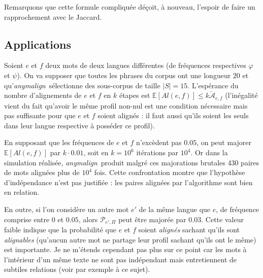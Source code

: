 \documentclass[a4paper,10pt]{article}
\newcommand{\anym}{\emph{anymalign}}
\begin{document}
Remarquons que cette formule compliquée déçoit, à nouveau, l'espoir de faire un rapprochement avec le Jaccard.



\subsection{Applications}

Soient $e$ et $f$ deux mots de deux langues différentes (de fréquences respectives $\varphi$ et $\psi$). On va supposer que toutes les phrases du corpus ont une longueur $20$ et qu'\anym~sélectionne des sous-corpus de taille $|S|=15$. L'espérance du nombre d'alignements de $e$ et $f$ en $k$ étapes est $\mathbb{E}[Al(e,f)] \leq k\check{\mathcal{A}}_{e,f}$ (l'inégalité vient du fait qu'avoir le même profil non-nul est une condition nécessaire mais pas suffisante pour que $e$ et $f$ soient alignés : il faut aussi qu'ils soient les seuls dans leur langue respective à posséder ce profil).

En supposant que les fréquences de $e$ et $f$ n'excèdent pas $0.05$, on peut majorer $\mathbb{E}[Al(e,f)]$ par $k\cdot0.01$, soit en $k=10^6$ itérations par $10^4$. Or dans la simulation réalisée, \anym~produit malgré ces majorations brutales 430 paires de mots alignées plus de $10^4$ fois. Cette confrontation montre que l'hypothèse d'indépendance n'est pas justifiée : les paires alignées par l'algorithme sont bien en relation.

En outre, si l'on considère un autre mot $e'$ de la même langue que $e$, de fréquence comprise entre $0$ et $0.05$, alors $\mathcal{P}_{e',\Pi}$ peut être majorée par $0.03$. Cette valeur faible indique que la probabilité que $e$ et $f$ soient \emph{alignés} sachant qu'ils sont \emph{alignables} (qu'aucun autre mot ne partage leur profil sachant qu'ils ont le même) est importante. Je ne m'étends cependant pas plus sur ce point car les mots à l'intérieur d'un même texte ne sont pas indépendant mais entretiennent de subtiles relations (voir par exemple \cite{pecina2006combining} à ce sujet).




\end{document}
